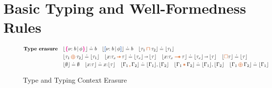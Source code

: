 \newpage
\section{Basic Typing and Well-Formedness Rules}\label{sec:tech:basic-typing}

\begin{figure}[ht!]
  {\small
  \begin{align*}
    \text{\textbf{Type erasure}} \quad & \eraserf{\ort{b}{\phi}} \doteq b \quad \eraserf{\urt{b}{\phi}} \doteq b \quad \eraserf{\tau_1 \ctinter \tau_2} \doteq \eraserf{\tau_1}
    \\&\eraserf{\tau_1 \ctoplus \tau_2} \doteq \eraserf{\tau_1} \quad  \eraserf{x{:}\tau_x \ctsarr \tau} \doteq \eraserf{\tau_x} \sarr \eraserf{\tau} \quad
    \eraserf{x{:}\tau_x \ctwand \tau} \doteq \eraserf{\tau_x} \sarr \eraserf{\tau} \quad
    \eraserf{\ctpers \tau} \doteq \eraserf{\tau}
    \\& \eraserf{\emptyset} \doteq \emptyset \quad \eraserf{x{:}\tau} \doteq x{:}\eraserf{\tau} \quad \eraserf{\Gamma_1 \ctcomma \Gamma_2} \doteq \eraserf{\Gamma_1}, \eraserf{\Gamma_2} \quad \eraserf{\Gamma_1 \ctstar \Gamma_2} \doteq \eraserf{\Gamma_1}, \eraserf{\Gamma_2}  \quad \eraserf{\Gamma_1 \ctoplus \Gamma_2} \doteq \eraserf{\Gamma_1}
 \end{align*}}
\caption{Type and Typing Context Erasure}
\label{fig:type-erasure}
\end{figure}

